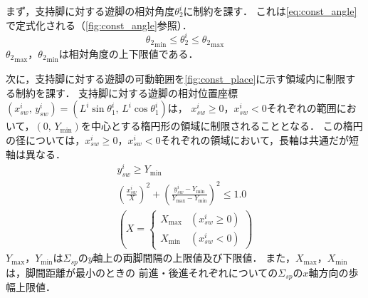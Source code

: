 \documentclass[autodetect-engine,dvipdfmx-if-dvi,ja=standard,a4j,jbase=11pt,magstyle=nomag*]{bxjsreport}
\begin{document}
まず，支持脚に対する遊脚の相対角度$\theta_2^i$に制約を課す．
これは\cref{eq:const_angle}で定式化される（\cref{fig:const_angle}参照）．
\begin{equation}
    \label{eq:const_angle}
    {\theta_2}_{\mathrm{min}} \leq \theta_2^i \leq {\theta_2}_{\mathrm{max}}
\end{equation}
${\theta_2}_{\mathrm{max}}$，${\theta_2}_{\mathrm{min}}$は相対角度の上下限値である．


次に，支持脚に対する遊脚の可動範囲を\cref{fig:const_place}に示す領域内に制限する制約を課す．
支持脚に対する遊脚の相対位置座標$( x_{sw}^i ,\, y_{sw}^i ) = ( L^i \sin \theta_1^i ,\, L^i \cos \theta_1^i )$は，
$x_{sw}^i \geq 0$，$x_{sw}^i < 0$それぞれの範囲において，$( 0 ,\, Y_{\mathrm{min}} )$を中心とする楕円形の領域に制限されることとなる．
この楕円の径については，$x_{sw}^i \geq 0$，$x_{sw}^i < 0$それぞれの領域において，長軸は共通だが短軸は異なる．
\begin{equation}
\label{eq:const_place}
    \begin{gathered}
        y_{sw}^i \geq Y_{\mathrm{min}} \\ 
        \left( \frac{x_{sw}^i}{X} \right)^2 + \left( \frac{y_{sw}^i - Y_{\mathrm{min}}}{Y_{\mathrm{max}} - Y_{\mathrm{min}}} \right)^2 \leq 1.0 \\
        \left( X = 
        \begin{cases}
            X_{\mathrm{max}} & \left( x_{sw}^i \geq 0 \right) \\
            X_{\mathrm{min}} & \left( x_{sw}^i < 0 \right)
        \end{cases}
        \right)
    \end{gathered}
\end{equation}
$Y_{\mathrm{max}}$，$Y_{\mathrm{min}}$は$\Sigma_{sp}$の$y$軸上の両脚間隔の上限値及び下限値．
また，$X_{\mathrm{max}}$，$X_{\mathrm{min}}$は，脚間距離が最小のときの
前進・後進それぞれについての$\Sigma_{sp}$の$x$軸方向の歩幅上限値．
\end{document}

